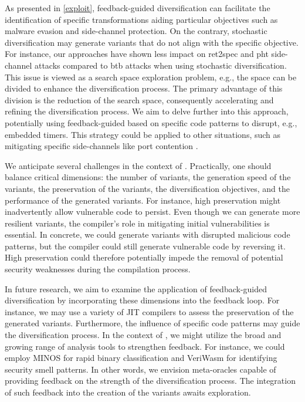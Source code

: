     
\begin{strategy}
As presented in \autoref{exploit}, feedback-guided diversification can facilitate the identification of specific transformations aiding particular objectives such as malware evasion and side-channel protection. 
On the contrary, stochastic diversification may generate variants that do not align with the specific objective. 
For instance, our approaches have shown less impact on ret2spec and pht side-channel attacks compared to btb attacks when using stochastic diversification. 
This issue is viewed as a search space exploration problem, e.g., the space can be divided to enhance the diversification process. 
The primary advantage of this division is the reduction of the search space, consequently accelerating and refining the diversification process. 
We aim to delve further into this approach, potentially using feedback-guided based on specific code patterns to disrupt, e.g., embedded timers. 
This strategy could be applied to other situations, such as mitigating specific side-channels like port contention \cite{10.1145/3488932.3517411}.

We anticipate several challenges in the context of \Wasm. 
Practically, one should balance critical dimensions: the number of variants, the generation speed of the variants, the preservation of the variants, the diversification objectives, and the performance of the generated variants. 
For instance, high preservation might inadvertently allow vulnerable code to persist. 
Even though we can generate more resilient variants, the compiler's role in mitigating initial vulnerabilities is essential.
In concrete, we could generate variants with disrupted malicious code patterns, but the compiler could still generate vulnerable code by reversing it. 
High preservation could therefore potentially impede the removal of potential security weaknesses during the compilation process.

In future research, we aim to examine the application of feedback-guided diversification by incorporating these dimensions into the feedback loop. 
For instance, we may use a variety of \Wasm JIT compilers\cite{2023arXiv230513241T} to assess the preservation of the generated variants. 
Furthermore, the influence of specific code patterns may guide the diversification process. 
In the context of \Wasm, we might utilize the broad and growing range of analysis tools to strengthen feedback.
For instance, we could employ MINOS \cite{MINOS} for rapid binary classification and VeriWasm\cite{veriwasm} for identifying security smell patterns.
In other words, we envision meta-oracles capable of providing feedback on the strength of the diversification process.
The integration of such feedback into the creation of the \Wasm variants awaits exploration.




\end{strategy}